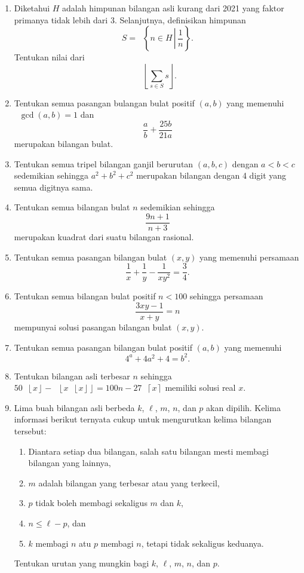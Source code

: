 \documentclass[12pt]{article}
\newcommand*\floor[1]{\mathop{}\!\left\lfloor{#1}\right\rfloor}
\newcommand*\ceil[1]{\mathop{}\!\left\lceil{#1}\right\rceil}
\newcommand*\func[2]{\mathop{}\!{#1}{\left({#2}\right)}}
\newcommand*\set[2]{\mathop{}\!\left\lbrace{{#1} \, \left| \, {#2} \right.}\right\rbrace}
\begin{document}
\begin{enumerate}[leftmargin=*]
		\item Diketahui $ H $ adalah himpunan bilangan asli kurang dari 2021 yang faktor primanya tidak lebih dari 3. Selanjutnya, definisikan himpunan
		\[ S = \set{n \in H}{\frac{1}{n}}. \]
		Tentukan nilai dari
		\[ \floor{\sum_{s \in S}{s}}. \]
		\item Tentukan semua pasangan bulangan bulat positif $ \left(a, b\right) $ yang memenuhi $ \func{\gcd}{a, b} = 1 $ dan
		\[ \frac{a}{b} + \frac{25b}{21a} \]
		merupakan bilangan bulat.
		\item Tentukan semua tripel bilangan ganjil berurutan $ \left(a, b, c\right) $ dengan $ a < b < c $ sedemikian sehingga $ a^{2} + b^{2} + c^{2} $ merupakan bilangan dengan 4 digit yang semua digitnya sama.
		\item Tentukan semua bilangan bulat $ n $ sedemikian sehingga
		\[ \frac{9n + 1}{n + 3} \]
		merupakan kuadrat dari suatu bilangan rasional.
		\item Tentukan semua pasangan bilangan bulat $ \left(x, y\right) $ yang memenuhi persamaan
		\[ \frac{1}{x} + \frac{1}{y} - \frac{1}{xy^{2}} = \frac{3}{4}. \]
		\item Tentukan semua bilangan bulat positif $ n < 100 $ sehingga persamaan
		\[ \frac{3xy - 1}{x + y} = n \]
		mempunyai solusi pasangan bilangan bulat $ \left(x, y\right) $.
		\item Tentukan semua pasangan bilangan bulat positif $ \left(a, b\right) $ yang memenuhi
		\[ 4^{a} + 4a^{2} + 4 = b^{2}. \]
		\item Tentukan bilangan asli terbesar $ n $ sehingga $ 50\floor{x} - \floor{x\floor{x}} = 100n - 27\ceil{x} $ memiliki solusi real $ x $.
		\item Lima buah bilangan asli berbeda $ k $, $ \ell $, $ m $, $ n $, dan $ p $ akan dipilih. Kelima informasi berikut ternyata cukup untuk mengurutkan kelima bilangan tersebut:
		\begin{enumerate}
			\item Diantara setiap dua bilangan, salah satu bilangan mesti membagi bilangan yang lainnya,
			\item $ m $ adalah bilangan yang terbesar atau yang terkecil,
			\item $ p $ tidak boleh membagi sekaligus $ m $ dan $ k $,
			\item $ n \leq \ell - p $, dan
			\item $ k $ membagi $ n $ atu $ p $ membagi $ n $, tetapi tidak sekaligus keduanya.
		\end{enumerate}
		Tentukan urutan yang mungkin bagi $ k $, $ \ell $, $ m $, $ n $, dan $ p $.

\end{enumerate}
\end{document}
